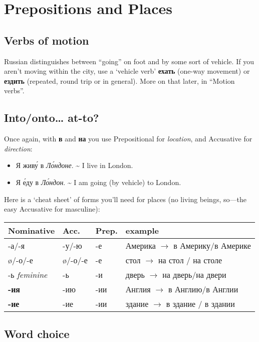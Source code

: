 \chapter{Prepositions and Places}\label{prepositions-and-places}

\section{Verbs of motion}\label{verbs-of-motion}

Russian distinguishes between ``going'' on foot and by some sort of
vehicle. If you aren't moving within the city, use a `vehicle verb'
\textbf{ехать} (one-way movement) or \textbf{ездить} (repeated, round
trip or in general). More on that later, in ``Motion verbs''.

\section{Into/onto\ldots{} at-to?}\label{intoonto-at-to}

Once again, with \textbf{в} and \textbf{на} you use Prepositional for
\emph{location}, and Accusative for \emph{direction}:

\begin{itemize}
\tightlist
\item
  Я жив\'{у} в \emph{Л\'{о}ндоне}. \textasciitilde{} I live in London.
\item
  Я \'{е}ду в \emph{Л\'{о}ндон}. \textasciitilde{} I am going (by vehicle) to
  London.
\end{itemize}

Here is a `cheat sheet' of forms you'll need for places (no living
beings, so---the easy Accusative for masculine):

\begin{longtable}[]{@{}llll@{}}
\toprule
Nominative & Acc. & Prep. & example\tabularnewline
\midrule
\endhead
-а/-я & -у/-ю & -е & Америка $ \rightarrow$ в Америку/в Америке\tabularnewline
\o/-о/-е & \o/-о/-е & -е & стол $ \rightarrow$ на стол / на столе\tabularnewline
-ь \emph{feminine} & -ь & -и & дверь $ \rightarrow$ на дверь/на двери\tabularnewline
\textbf{-ия} & -ию & -ии & Англия $ \rightarrow$ в Англию/в Англии\tabularnewline
\textbf{-ие} & -ие & -ии & здание $ \rightarrow$ в здание / в здании\tabularnewline
\bottomrule
\end{longtable}

\section{Word choice}\label{word-choice}

